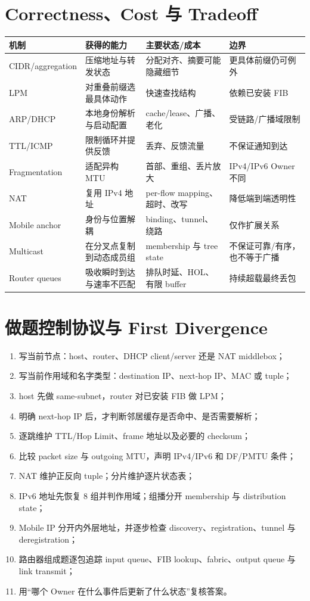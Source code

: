 \documentclass[11pt,a4paper]{ctexart}
\begin{document}
\section{Correctness、Cost 与 Tradeoff}

\begin{center}
\small
\begin{tabularx}{\linewidth}{L{2.4cm}Y Y Y}
\toprule
机制 & 获得的能力 & 主要状态/成本 & 边界\\
\midrule
CIDR/aggregation & 压缩地址与转发状态 & 分配对齐、摘要可能隐藏细节 & 更具体前缀仍可例外\\
LPM & 对重叠前缀选最具体动作 & 快速查找结构 & 依赖已安装 FIB\\
ARP/DHCP & 本地身份解析与启动配置 & cache/lease、广播、老化 & 受链路/广播域限制\\
TTL/ICMP & 限制循环并提供反馈 & 丢弃、反馈流量 & 不保证通知到达\\
Fragmentation & 适配异构 MTU & 首部、重组、丢片放大 & IPv4/IPv6 Owner 不同\\
NAT & 复用 IPv4 地址 & per-flow mapping、超时、改写 & 降低端到端透明性\\
Mobile anchor & 身份与位置解耦 & binding、tunnel、绕路 & 仅作扩展关系\\
Multicast & 在分叉点复制到动态成员组 & membership 与 tree state & 不保证可靠/有序，也不等于广播\\
Router queues & 吸收瞬时到达与速率不匹配 & 排队时延、HOL、有限 buffer & 持续超载最终丢包\\
\bottomrule
\end{tabularx}
\end{center}

\section{做题控制协议与 First Divergence}

\begin{enumerate}
  \item 写当前节点：host、router、DHCP client/server 还是 NAT middlebox；
  \item 写当前作用域和名字类型：destination IP、next-hop IP、MAC 或 tuple；
  \item host 先做 same-subnet，router 对已安装 FIB 做 LPM；
  \item 明确 next-hop IP 后，才判断邻居缓存是否命中、是否需要解析；
  \item 逐跳维护 TTL/Hop Limit、frame 地址以及必要的 checksum；
  \item 比较 packet size 与 outgoing MTU，声明 IPv4/IPv6 和 DF/PMTU 条件；
  \item NAT 维护正反向 tuple；分片维护逐片状态表；
  \item IPv6 地址先恢复 8 组并判作用域；组播分开 membership 与 distribution state；
  \item Mobile IP 分开内外层地址，并逐步检查 discovery、registration、tunnel 与 deregistration；
  \item 路由器组成题逐包追踪 input queue、FIB lookup、fabric、output queue 与 link transmit；
  \item 用“哪个 Owner 在什么事件后更新了什么状态”复核答案。
\end{enumerate}
\end{document}
